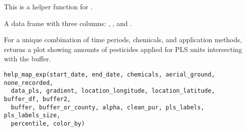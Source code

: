 \documentclass[a4paper]{book}
\begin{document}
%
\begin{Details}\relax
This is a helper function for .
\end{Details}
%
\begin{Value}
A data frame with three columns: , ,
and .
\end{Value}
%
\begin{Description}\relax
For a unique combination of time periods, chemicals, and application methods,
 returns a plot showing amounts of pesticides applied for PLS
units intersecting with the buffer.
\end{Description}
%
\begin{Usage}
\begin{verbatim}
help_map_exp(start_date, end_date, chemicals, aerial_ground, none_recorded,
  data_pls, gradient, location_longitude, location_latitude, buffer_df, buffer2,
  buffer, buffer_or_county, alpha, clean_pur, pls_labels, pls_labels_size,
  percentile, color_by)
\end{verbatim}
\end{Usage}
%
\end{document}
